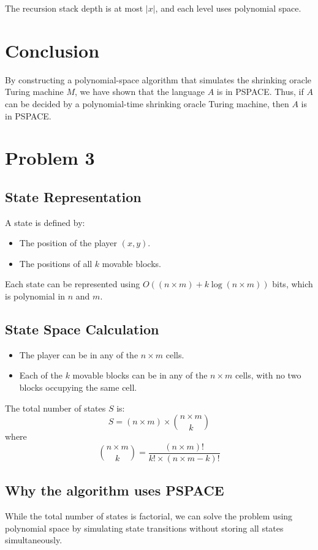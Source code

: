 \documentclass{article}
\begin{document}
The recursion stack depth is at most \( |x| \), and each level uses polynomial space.

\section*{Conclusion}

By constructing a polynomial-space algorithm that simulates the shrinking oracle Turing machine \( M \), we have shown that the language \( A \) is in PSPACE. Thus, if \( A \) can be decided by a polynomial-time shrinking oracle Turing machine, then \( A \) is in PSPACE.
\pagebreak

\section{Problem 3}
\subsection*{State Representation}
A state is defined by:
\begin{itemize}
    \item The position of the player \((x, y)\).
    \item The positions of all \( k \) movable blocks.
\end{itemize}
Each state can be represented using \( O((n \times m) + k \log(n \times m)) \) bits, which is polynomial in \( n \) and \( m \).

\subsection*{State Space Calculation}
\begin{itemize}
    \item The player can be in any of the \( n \times m \) cells.
    \item Each of the \( k \) movable blocks can be in any of the \( n \times m \) cells, with no two blocks occupying the same cell.
\end{itemize}
The total number of states \( S \) is:
\[
S = (n \times m) \times \binom{n \times m}{k}
\]
where
\[
\binom{n \times m}{k} = \frac{(n \times m)!}{k! \times (n \times m - k)!}
\]

\subsection*{Why the algorithm uses PSPACE}
While the total number of states is factorial, we can solve the problem using polynomial space by simulating state transitions without storing all states simultaneously.
\end{document}
